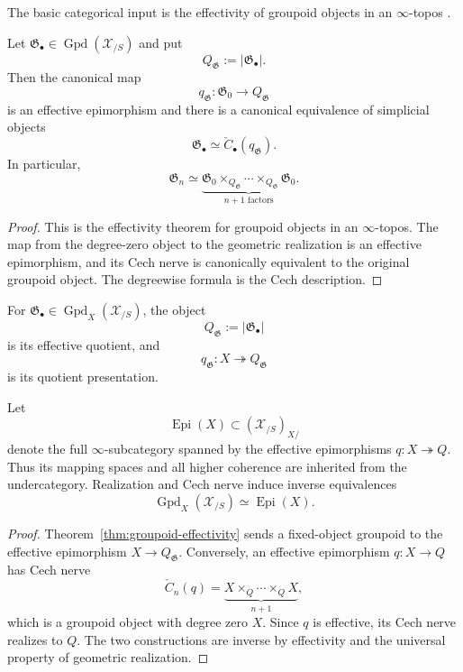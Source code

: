 The basic categorical input is the effectivity of groupoid objects in an
$\infty$-topos \cite{LurieHTT}.

\begin{theorem}
\label{thm:groupoid-effectivity}
Let $\mathfrak G_\bullet\in
\operatorname{Gpd}(\mathcal X_{/S})$ and put
\[
    Q_{\mathfrak G}:=\lvert\mathfrak G_\bullet\rvert .
\]
Then the canonical map
\[
    q_{\mathfrak G}:
    \mathfrak G_0\longrightarrow Q_{\mathfrak G}
\]
is an effective epimorphism and there is a canonical equivalence of simplicial
objects
\[
    \mathfrak G_\bullet
    \simeq
    \check C_\bullet(q_{\mathfrak G}).
\]
In particular,
\[
    \mathfrak G_n
    \simeq
    \underbrace{
    \mathfrak G_0
    \times_{Q_{\mathfrak G}}\cdots
    \times_{Q_{\mathfrak G}}
    \mathfrak G_0}_{n+1\text{ factors}}.
\]
\end{theorem}

\begin{proof}
This is the effectivity theorem for groupoid objects in an $\infty$-topos.
The map from the degree-zero object to the geometric realization is an effective
epimorphism, and its Cech nerve is canonically equivalent to the original
groupoid object.  The degreewise formula is the Cech description.
\end{proof}

\begin{definition}
\label{def:groupoid-quotient}
For $\mathfrak G_\bullet\in
\operatorname{Gpd}_X(\mathcal X_{/S})$, the object
\[
    Q_{\mathfrak G}:=\lvert\mathfrak G_\bullet\rvert
\]
is its effective quotient, and
\[
    q_{\mathfrak G}:X\twoheadrightarrow Q_{\mathfrak G}
\]
is its quotient presentation.
\end{definition}

\begin{proposition}
\label{prop:groupoids-effective-quotients-equivalence}
Let
\[
    \operatorname{Epi}(X)
    \subset
    (\mathcal X_{/S})_{X/}
\]
denote the full $\infty$-subcategory spanned by the effective epimorphisms
$q:X\twoheadrightarrow Q$.  Thus its mapping spaces and all higher coherence
are inherited from the undercategory.  Realization and Cech nerve induce
inverse equivalences
\[
    \operatorname{Gpd}_X(\mathcal X_{/S})
    \simeq
    \operatorname{Epi}(X).
\]
\end{proposition}

\begin{proof}
Theorem~\ref{thm:groupoid-effectivity} sends a fixed-object groupoid to the
effective epimorphism $X\to Q_{\mathfrak G}$.  Conversely, an effective
epimorphism $q:X\to Q$ has Cech nerve
\[
    \check C_n(q)
    =
    \underbrace{X\times_Q\cdots\times_QX}_{n+1},
\]
which is a groupoid object with degree zero $X$.  Since $q$ is effective, its
Cech nerve realizes to $Q$.  The two constructions are inverse by effectivity
and the universal property of geometric realization.
\end{proof}

